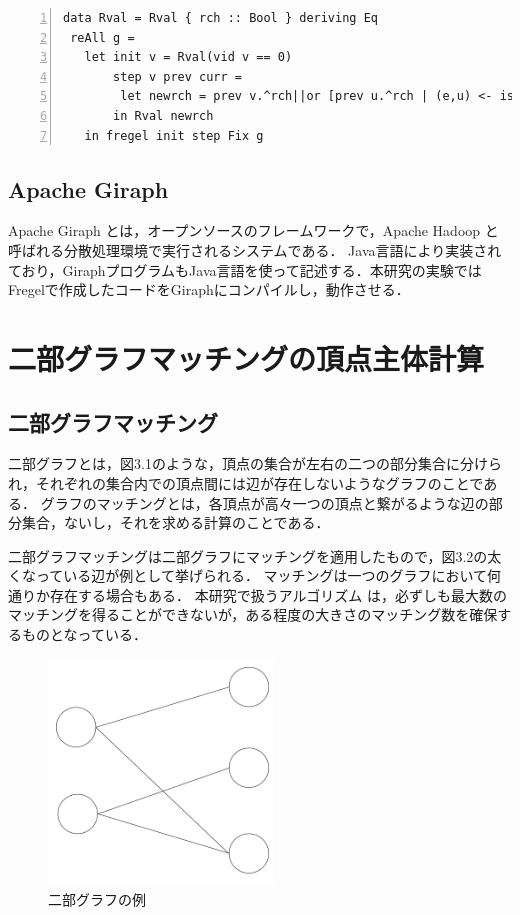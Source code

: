 \documentclass[12pt]{ujreport}
\begin{document}
\begin{lstlisting}[basicstyle=\ttfamily\footnotesize, frame = single,  numbers = left, tabsize = 3, captionpos = b, caption = {Fregelのプログラム例}]
data Rval = Rval { rch :: Bool } deriving Eq
 reAll g =
   let init v = Rval(vid v == 0)
       step v prev curr =
        let newrch = prev v.^rch||or [prev u.^rch | (e,u) <- is v]
       in Rval newrch
   in fregel init step Fix g
\end{lstlisting}

\section{Apache Giraph}
Apache Giraph \cite{giraph}とは，オープンソースのフレームワークで，Apache Hadoop \cite{hadoop}と呼ばれる分散処理環境で実行されるシステムである．
Java言語により実装されており，GiraphプログラムもJava言語を使って記述する．本研究の実験ではFregelで作成したコードをGiraphにコンパイルし，動作させる．

\newpage

\chapter{二部グラフマッチングの頂点主体計算}
\section{二部グラフマッチング}
二部グラフとは，図3.1のような，頂点の集合が左右の二つの部分集合に分けられ，それぞれの集合内での頂点間には辺が存在しないようなグラフのことである．
グラフのマッチングとは，各頂点が高々一つの頂点と繋がるような辺の部分集合，ないし，それを求める計算のことである．

二部グラフマッチングは二部グラフにマッチングを適用したもので，図3.2の太くなっている辺が例として挙げられる．
マッチングは一つのグラフにおいて何通りか存在する場合もある．
本研究で扱うアルゴリズム \cite{pregel}は，必ずしも最大数のマッチングを得ることができないが，ある程度の大きさのマッチング数を確保するものとなっている．

\begin{figure}[ht]
  \centering
  \includegraphics[width=6cm]{二部グラフ例.pdf}
  \caption{二部グラフの例}
\end{figure}
\end{document}

